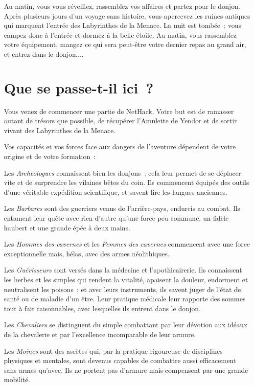 \documentclass[titlepage]{article}
\begin{document}
Au matin, vous vous réveillez, rassemblez vos affaires et partez pour le
donjon.
Après plusieurs jours d'un voyage sans histoire, vous apercevez les ruines
antiques qui marquent l'entrée des Labyrinthes de la Menace.
La nuit est tombée~; vous campez donc à l'entrée et dormez à la belle
étoile.
Au matin, vous rassemblez votre équipement, mangez ce qui sera peut-être
votre dernier repas au grand air, et entrez dans le donjon....

\section{Que se passe-t-il ici~?}



Vous venez de commencer une partie de NetHack.
Votre but est de ramasser autant de trésors que possible, de récupérer
l'Amulette de Yendor et de sortir vivant des Labyrinthes de la Menace.


Vos capacités et vos forces face aux dangers de l'aventure dépendent de
votre origine et de votre formation~:


Les \textit{Archéologues} connaissent bien les donjons~; cela leur permet de
se déplacer vite et de surprendre les vilaines bêtes du coin.
Ils commencent équipés des outils d'une véritable expédition scientifique,
et savent lire les langues anciennes.


Les \textit{Barbares} sont des guerriers venus de l'arrière-pays, endurcis au
combat.
Ils entament leur quête avec rien d'autre qu'une force peu commune, un
fidèle haubert et une grande épée à deux mains.


Les \textit{Hommes des cavernes} et les \textit{Femmes des cavernes} commencent
avec une force exceptionnelle mais, hélas, avec des armes néolithiques.


Les \textit{Guérisseurs} sont versés dans la médecine et l'apothicairerie.
Ils connaissent les herbes et les simples qui rendent la vitalité,
apaisent la douleur, endorment et neutralisent les poisons~; et avec leurs
instruments, ils savent juger de l'état de santé ou de maladie d'un être.
Leur pratique médicale leur rapporte des sommes tout à fait raisonnables,
avec lesquelles ils entrent dans le donjon.


Les \textit{Chevaliers} se distinguent du simple combattant par leur dévotion
aux idéaux de la chevalerie et par l'excellence incomparable de leur
armure.


Les \textit{Moines} sont des ascètes qui, par la pratique rigoureuse de
disciplines physiques et mentales, sont devenus capables de combattre aussi
efficacement sans armes qu'avec.
Ils ne portent pas d'armure mais compensent par une grande mobilité.
\end{document}
